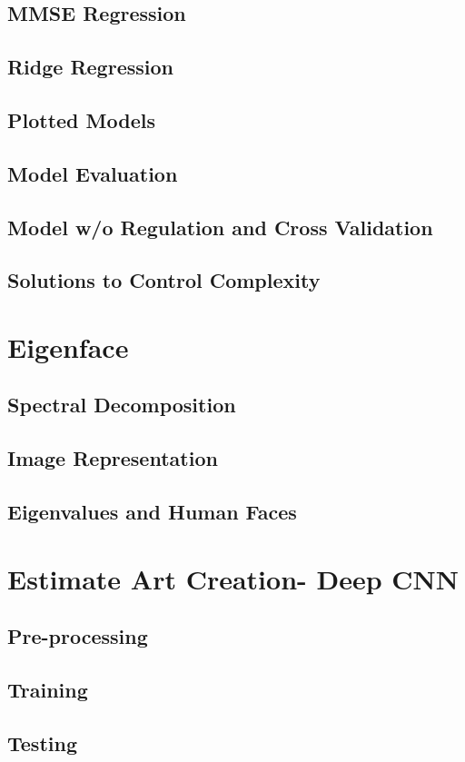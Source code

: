 \documentclass{article}
\begin{document}
\subsection{MMSE Regression}
\subsection{Ridge Regression}
\subsection{Plotted Models}
\subsection{Model Evaluation}
\subsection{Model w/o Regulation and Cross Validation}
\subsection{Solutions to Control Complexity}

\section{Eigenface}
\subsection{Spectral Decomposition}
\subsection{Image Representation}
\subsection{Eigenvalues and Human Faces}

\section{Estimate Art Creation- Deep CNN}
\subsection{Pre-processing}
\subsection{Training}
\subsection{Testing}
\end{document}

